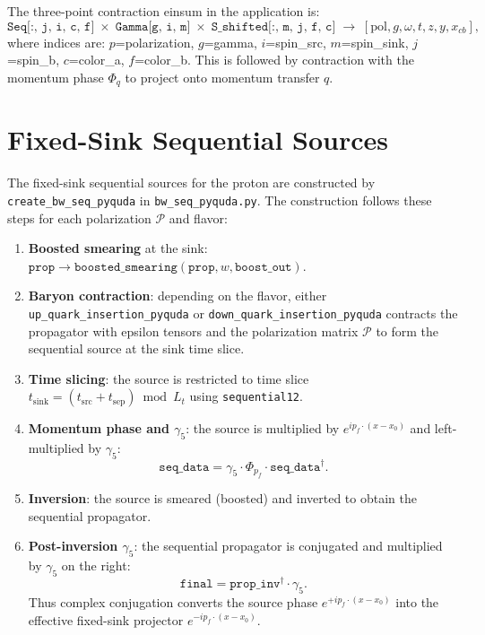 \documentclass[11pt,a4paper]{article}
\newcommand{\xvec}{x}
\newcommand{\xzerovec}{x_0}
\begin{document}
The three-point contraction einsum in the application is:
\begin{equation}
  \texttt{Seq[:, j, i, c, f]} \;\times\;
  \texttt{Gamma[g, i, m]} \;\times\;
  \texttt{S\_shifted[:, m, j, f, c]}
  \;\to\; [\text{pol}, g, \omega, t, z, y, x_{cb}],
\end{equation}
where indices are: $p$=polarization, $g$=gamma, $i$=spin\_src, $m$=spin\_sink,
$j$=spin\_b, $c$=color\_a, $f$=color\_b. This is followed by contraction with the
momentum phase $\Phi_q$ to project onto momentum transfer $q$.

\section{Fixed-Sink Sequential Sources}
\label{sec:sequential}

The fixed-sink sequential sources for the proton are constructed by
\texttt{create\_bw\_seq\_pyquda} in \texttt{bw\_seq\_pyquda.py}. The construction
follows these steps for each polarization $\mathcal{P}$ and flavor:

\begin{enumerate}
  \item \textbf{Boosted smearing} at the sink: $\texttt{prop} \to
    \texttt{boosted\_smearing}(\texttt{prop}, w, \texttt{boost\_out})$.
  \item \textbf{Baryon contraction}: depending on the flavor, either
    \texttt{up\_quark\_insertion\_pyquda} or \texttt{down\_quark\_insertion\_pyquda}
    contracts the propagator with epsilon tensors and the polarization matrix
    $\mathcal{P}$ to form the sequential source at the sink time slice.
  \item \textbf{Time slicing}: the source is restricted to time slice
    $t_{\text{sink}} = (t_{\text{src}} + t_{\text{sep}}) \bmod L_t$ using
    \texttt{sequential12}.
  \item \textbf{Momentum phase and $\gamma_5$}: the source is multiplied by
    $e^{i p_f \cdot (\xvec - \xzerovec)}$ and left-multiplied by $\gamma_5$:
    \begin{equation}
      \texttt{seq\_data} = \gamma_5 \cdot \Phi_{p_f} \cdot
        \texttt{seq\_data}^\dagger.
    \end{equation}
  \item \textbf{Inversion}: the source is smeared (boosted) and inverted to obtain
    the sequential propagator.
  \item \textbf{Post-inversion $\gamma_5$}: the sequential propagator is conjugated
    and multiplied by $\gamma_5$ on the right:
    \begin{equation}
      \texttt{final} = \texttt{prop\_inv}^\dagger \cdot \gamma_5.
    \end{equation}
    Thus complex conjugation converts the source phase
    $e^{+i p_f\cdot(\xvec-\xzerovec)}$ into the effective fixed-sink
    projector $e^{-i p_f\cdot(\xvec-\xzerovec)}$.
\end{enumerate}
\end{document}
